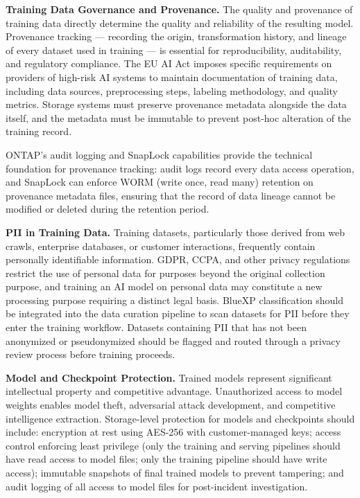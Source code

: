 \begin{securitybox}

\textbf{Training Data Governance and Provenance.}
The quality and provenance of training data directly determine the quality and reliability of the resulting model. Provenance tracking --- recording the origin, transformation history, and lineage of every dataset used in training --- is essential for reproducibility, auditability, and regulatory compliance. The EU AI Act imposes specific requirements on providers of high-risk AI systems to maintain documentation of training data, including data sources, preprocessing steps, labeling methodology, and quality metrics. Storage systems must preserve provenance metadata alongside the data itself, and the metadata must be immutable to prevent post-hoc alteration of the training record.

ONTAP's audit logging and SnapLock capabilities provide the technical foundation for provenance tracking: audit logs record every data access operation, and SnapLock can enforce WORM (write once, read many) retention on provenance metadata files, ensuring that the record of data lineage cannot be modified or deleted during the retention period.

\textbf{PII in Training Data.}
Training datasets, particularly those derived from web crawls, enterprise databases, or customer interactions, frequently contain personally identifiable information. GDPR, CCPA, and other privacy regulations restrict the use of personal data for purposes beyond the original collection purpose, and training an AI model on personal data may constitute a new processing purpose requiring a distinct legal basis. BlueXP classification should be integrated into the data curation pipeline to scan datasets for PII before they enter the training workflow. Datasets containing PII that has not been anonymized or pseudonymized should be flagged and routed through a privacy review process before training proceeds.

\textbf{Model and Checkpoint Protection.}
Trained models represent significant intellectual property and competitive advantage. Unauthorized access to model weights enables model theft, adversarial attack development, and competitive intelligence extraction. Storage-level protection for models and checkpoints should include: encryption at rest using AES-256 with customer-managed keys; access control enforcing least privilege (only the training and serving pipelines should have read access to model files; only the training pipeline should have write access); immutable snapshots of final trained models to prevent tampering; and audit logging of all access to model files for post-incident investigation.


\end{securitybox}
